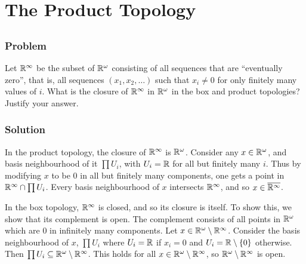 \setcounter{section}{18} %
\section{The Product Topology}
\label{sec-topspace-product}


\setcounter{subsection}{6} %
\subsection{}

\subsubsection{Problem}
Let $\mathbb R^\infty$ be the subset of $\mathbb R^\omega$ consisting of all sequences that are ``eventually zero'', that is, all sequences $(x_1, x_2, \ldots)$ such that $x_i \neq 0$ for only finitely many values of $i$. What is the closure of $\mathbb R^\infty$ in $\mathbb R^\omega$ in the box and product topologies? Justify your answer.

\subsubsection{Solution}
In the product topology, the closure of $\mathbb R^\infty$ is $\mathbb R^\omega$. Consider any $x \in \mathbb R^\omega$, and basis neighbourhood of it $\prod U_i$, with $U_i = \mathbb R$ for all but finitely many $i$. Thus by modifying $x$ to be $0$ in all but finitely many components, one gets a point in $\mathbb R^\infty \cap \prod U_i$. Every basis neighbourhood of $x$ intersects $\mathbb R^\infty$, and so $x \in \overline{\mathbb R^\infty}$.

In the box topology, $\mathbb R^\infty$ is closed, and so its closure is itself. To show this, we show that its complement is open. The complement consists of all points in $\mathbb R^\omega$ which are $0$ in infinitely many components. Let $x \in \mathbb R^\omega \setminus \mathbb R^\infty$. Consider the basis neighbourhood of $x$, $\prod U_i$ where $U_i = \mathbb R$ if $x_i = 0$ and $U_i = \mathbb R \setminus \{0\}$ otherwise. Then $\prod U_i \subseteq \mathbb R^\omega \setminus \mathbb R^\infty$. This holds for all $x \in \mathbb R^\omega \setminus \mathbb R^\infty$, so $\mathbb R^\omega \setminus \mathbb R^\infty$ is open.
